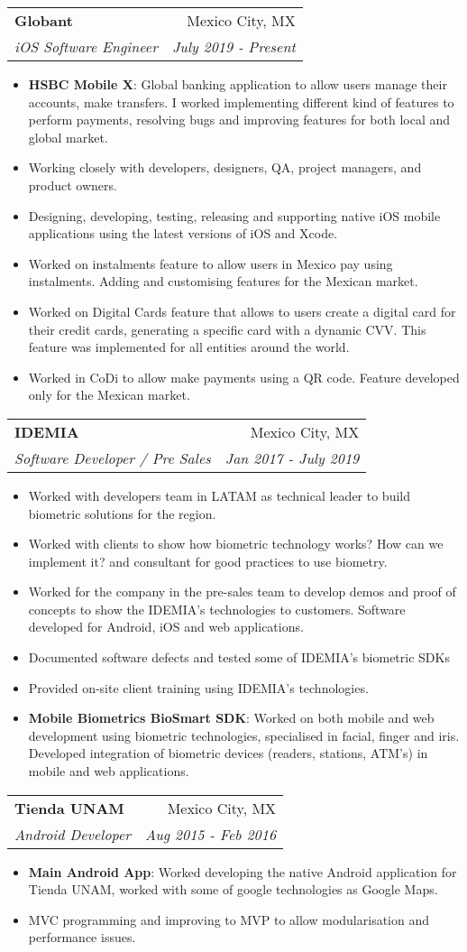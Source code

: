 \documentclass[letterpaper,11pt]{article}
\makeatletter
\newcommand{\resumeItem}[2]{
  \item\small{
    \textbf{#1}{: #2 \vspace{-2pt}}
  }
}
\newcommand{\resumeItemSimple}[1]{
  \item\small{
    {#1}
  }
}
\newcommand{\resumeSubheading}[4]{
  \vspace{-1pt}\item
    \begin{tabular*}{0.97\textwidth}{l@{\extracolsep{\fill}}r}
      \textbf{#1} & #2 \\
      \textit{\small#3} & \textit{\small #4} \\
    \end{tabular*}\vspace{-5pt}
}
\newcommand{\resumeItemListStart}{\begin{itemize}}
\newcommand{\resumeItemListEnd}{\end{itemize}\vspace{-5pt}}
\makeatother
\begin{document}
    \resumeSubheading
      {Globant}{Mexico City, MX}
      {iOS Software Engineer}{July 2019 - Present}
      \resumeItemListStart
        \resumeItem{HSBC Mobile X}{Global banking application to allow users manage their accounts, make transfers. I worked implementing different kind of features to perform payments, resolving bugs and improving features for both local and global market.}
        \resumeItemSimple{Working closely with developers, designers, QA, project managers, and product owners.}
        \resumeItemSimple{Designing, developing, testing, releasing and supporting native iOS mobile applications using the latest versions of iOS and Xcode.}
        \resumeItemSimple
          {Worked on instalments feature to allow users in Mexico pay using instalments. Adding and customising features for the Mexican market.}
        \resumeItemSimple
          {Worked on Digital Cards feature that allows to users create a digital card for their credit cards, generating a specific card with a dynamic CVV. This feature was implemented for all entities around the world.}
        \resumeItemSimple
          {Worked in CoDi to allow make payments using a QR code. Feature developed only for the Mexican market.}
      \resumeItemListEnd
      
      \resumeSubheading
      {IDEMIA}{Mexico City, MX}
      {Software Developer / Pre Sales}{Jan 2017 - July 2019}
      \resumeItemListStart
        \resumeItemSimple
        {Worked with developers team in LATAM as technical leader to build biometric solutions for the region.}
        \resumeItemSimple
        {Worked with clients to show how biometric technology works? How can we implement it? and consultant for good practices to use biometry.}
        \resumeItemSimple
        {Worked for the company in the pre-sales team to develop demos and proof of concepts to show the IDEMIA’s technologies to customers. Software developed for Android, iOS and web applications.}
        \resumeItemSimple
        {Documented software defects and tested some of IDEMIA’s biometric SDKs}
        \resumeItemSimple
        {Provided on-site client training using IDEMIA’s technologies.}
        \resumeItem{Mobile Biometrics BioSmart SDK}
          {Worked on both mobile and web development using biometric technologies, specialised in facial, finger and iris. Developed integration of biometric devices (readers, stations, ATM’s) in mobile and web applications.}
      \resumeItemListEnd
      
      \resumeSubheading
      {Tienda UNAM}{Mexico City, MX}
      {Android Developer}{Aug 2015 - Feb 2016}
      \resumeItemListStart
        \resumeItem{Main Android App}
          {Worked developing the native Android application for Tienda UNAM, worked with some of google technologies as Google Maps.}
          \resumeItemSimple{MVC programming and improving to MVP to allow modularisation and performance issues.}
      \resumeItemListEnd
      
\end{document}
